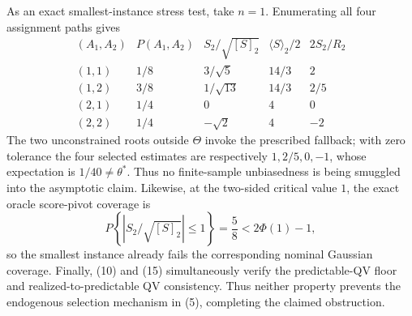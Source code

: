 As an exact smallest-instance stress test, take \(n=1\).  Enumerating all four assignment paths gives
\[
\begin{array}{c|c|c|c|c}
(A_1,A_2)&P(A_1,A_2)&S_2/\sqrt{[S]_2}&\langle S\rangle_2/2&2S_2/R_2\\ \hline
(1,1)&1/8&3/\sqrt5&14/3&2\\
(1,2)&3/8&1/\sqrt{13}&14/3&2/5\\
(2,1)&1/4&0&4&0\\
(2,2)&1/4&-\sqrt2&4&-2
\end{array}
\tag{30}
\]
The two unconstrained roots outside \(\Theta\) invoke the prescribed fallback; with zero tolerance the four selected estimates are respectively \(1,2/5,0,-1\), whose expectation is \(1/40\ne\theta^*\).  Thus no finite-sample unbiasedness is being smuggled into the asymptotic claim.  Likewise, at the two-sided critical value \(1\), the exact oracle score-pivot coverage is
\[
 P\!\left\{\left|S_2/\sqrt{[S]_2}\right|\le1\right\}=\frac58
 <2\Phi(1)-1,
\tag{31}
\]
so the smallest instance already fails the corresponding nominal Gaussian coverage.  Finally, (10) and (15) simultaneously verify the predictable-QV floor and realized-to-predictable QV consistency.  Thus neither property prevents the endogenous selection mechanism in (5), completing the claimed obstruction.